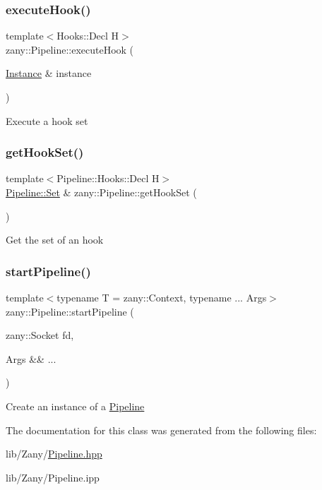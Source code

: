 \subsubsection{\texorpdfstring{execute\+Hook()}{executeHook()}}
{\footnotesize\ttfamily template$<$Hooks\+::\+Decl H$>$ \\
zany\+::\+Pipeline\+::execute\+Hook (\begin{DoxyParamCaption}\item[{\hyperlink{classzany_1_1_pipeline_1_1_instance}{Instance} \&}]{instance }\end{DoxyParamCaption})\hspace{0.3cm}{\ttfamily [inline]}}

Execute a hook set \mbox{\label{classzany_1_1_pipeline_afe387915735556acc7fc8382d9504bb7}} 
\subsubsection{\texorpdfstring{get\+Hook\+Set()}{getHookSet()}}
{\footnotesize\ttfamily template$<$Pipeline\+::\+Hooks\+::\+Decl H$>$ \\
\hyperlink{classzany_1_1_pipeline_1_1_set}{Pipeline\+::\+Set} \& zany\+::\+Pipeline\+::get\+Hook\+Set (\begin{DoxyParamCaption}{ }\end{DoxyParamCaption})\hspace{0.3cm}{\ttfamily [inline]}}

Get the set of an hook \mbox{\label{classzany_1_1_pipeline_a6d37ae7b4a0045d1a9a5a8dacbd8ac29}} 
\subsubsection{\texorpdfstring{start\+Pipeline()}{startPipeline()}}
{\footnotesize\ttfamily template$<$typename T  = zany\+::\+Context, typename ... Args$>$ \\
zany\+::\+Pipeline\+::start\+Pipeline (\begin{DoxyParamCaption}\item[{zany\+::\+Socket}]{fd,  }\item[{Args \&\&}]{... }\end{DoxyParamCaption})\hspace{0.3cm}{\ttfamily [inline]}}

Create an instance of a \hyperlink{classzany_1_1_pipeline}{Pipeline} 

The documentation for this class was generated from the following files\+:\begin{DoxyCompactItemize}
\item 
lib/\+Zany/\hyperlink{_pipeline_8hpp}{Pipeline.\+hpp}\item 
lib/\+Zany/Pipeline.\+ipp\end{DoxyCompactItemize}
